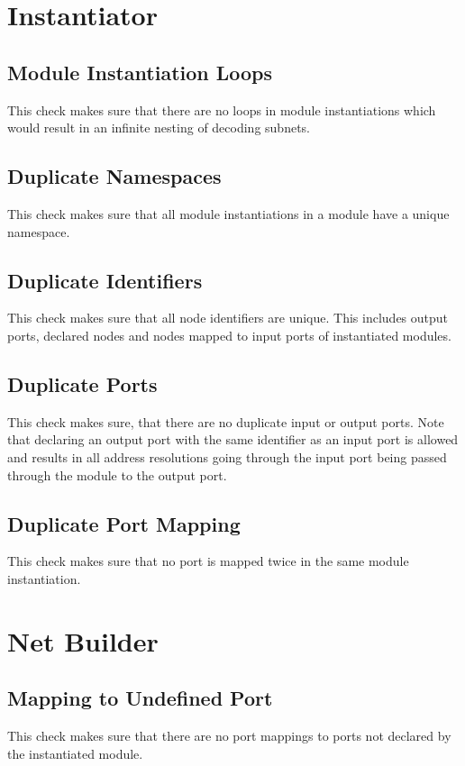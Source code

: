 \documentclass[a4paper,11pt,twoside]{report}
\begin{document}
{{{\section{Instantiator}
\subsection{Module Instantiation Loops}
This check makes sure that there are no loops in module instantiations which would result in an infinite nesting of decoding subnets.

\subsection{Duplicate Namespaces}
This check makes sure that all module instantiations in a module have a unique namespace.

\subsection{Duplicate Identifiers}
This check makes sure that all node identifiers are unique.
This includes output ports, declared nodes and nodes mapped to input ports of instantiated modules.

\subsection{Duplicate Ports}
This check makes sure, that there are no duplicate input or output ports.
Note that declaring an output port with the same identifier as an input port is allowed and results in all address resolutions going through the input port being passed through the module to the output port.

\subsection{Duplicate Port Mapping}
This check makes sure that no port is mapped twice in the same module instantiation.

\section{Net Builder}

\subsection{Mapping to Undefined Port}
This check makes sure that there are no port mappings to ports not declared by the instantiated module.

}}}
\end{document}
